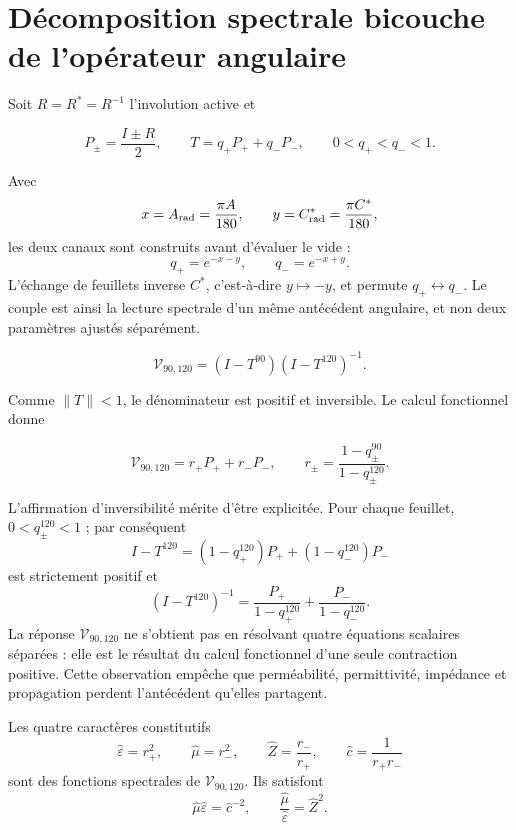 \section{Décomposition spectrale bicouche de l'opérateur angulaire}

Soit \(R=R^*=R^{-1}\) l'involution active et

\[
P_\pm=\frac{I\pm R}{2},
\qquad
T=q_+P_+ +q_-P_-,
\qquad 0<q_+<q_-<1.
\]

Avec
\[
x=A_{\rm rad}=\frac{\pi A}{180},\qquad
y=C^*_{\rm rad}=\frac{\pi C^*}{180},
\]
les deux canaux sont construits avant d'évaluer le vide :
\begin{equation}
q_+=e^{-x-y},\qquad q_-=e^{-x+y}.
\label{eq:vacuum-angular-channels}
\end{equation}
L'échange de feuillets inverse \(C^*\), c'est-à-dire \(y\mapsto-y\), et permute \(q_+\leftrightarrow q_-\). Le couple est ainsi la lecture spectrale d'un même antécédent angulaire, et non deux paramètres ajustés séparément.

\begin{definition}
\begin{equation}
\mathcal V_{90,120}=(I-T^{90})(I-T^{120})^{-1}.
\label{eq:vacuum-operator}
\end{equation}
\end{definition}

Comme \(\|T\|<1\), le dénominateur est positif et inversible. Le calcul fonctionnel donne

\begin{equation}
\mathcal V_{90,120}=r_+P_+ +r_-P_-,
\qquad
r_\pm=\frac{1-q_\pm^{90}}{1-q_\pm^{120}}.
\label{eq:vacuum-eigenvalues}
\end{equation}

L'affirmation d'inversibilité mérite d'être explicitée. Pour chaque feuillet,
\(0<q_\pm^{120}<1\) ; par conséquent
\[
I-T^{120}=(1-q_+^{120})P_++(1-q_-^{120})P_-
\]
est strictement positif et
\[
(I-T^{120})^{-1}
=\frac{P_+}{1-q_+^{120}}+
 \frac{P_-}{1-q_-^{120}}.
\]
La réponse \(\mathcal V_{90,120}\) ne s'obtient pas en résolvant quatre
équations scalaires séparées : elle est le résultat du calcul fonctionnel d'une
seule contraction positive. Cette observation empêche que perméabilité,
permittivité, impédance et propagation perdent l'antécédent qu'elles partagent.

\begin{theorem}
Les quatre caractères constitutifs
\begin{equation}
\widehat\varepsilon=r_+^2,\qquad
\widehat\mu=r_-^2,\qquad
\widehat Z=\frac{r_-}{r_+},\qquad
\widehat c=\frac1{r_+r_-}
\label{eq:vacuum-four}
\end{equation}
sont des fonctions spectrales de \(\mathcal V_{90,120}\). Ils satisfont
\begin{equation}
\widehat\mu\widehat\varepsilon=\widehat c^{-2},
\qquad
\frac{\widehat\mu}{\widehat\varepsilon}=\widehat Z^2.
\label{eq:vacuum-relations}
\end{equation}
\end{theorem}

